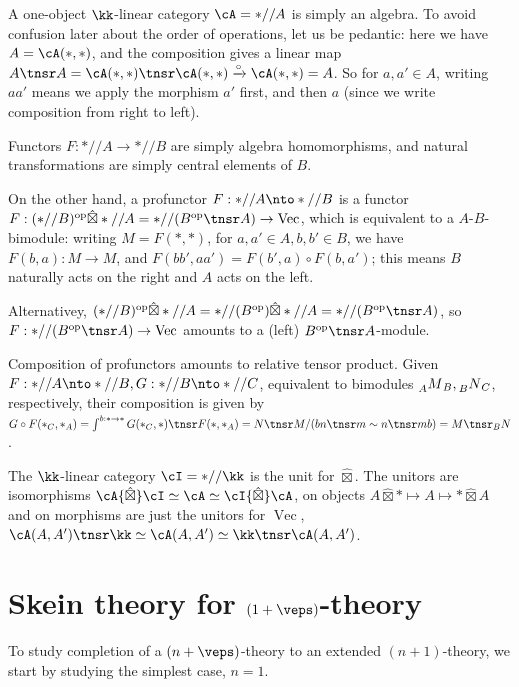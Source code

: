 \documentclass[12pt]{article}
\newcommand{\op}{{\text{op}}}
\newcommand{\hatbox}{{\hat{\boxtimes}}}
\DeclareMathOperator{\Vect}{Vec}
\begin{document}
\begin{example}
A one-object $\kk$-linear category $\cA = *//A$
is simply an algebra.
To avoid confusion later about the order of operations,
let us be pedantic: here we have $A = \cA(*,*)$,
and the composition gives a linear map
$A \tnsr A = \cA(*,*) \tnsr \cA(*,*) \xrightarrow{\circ} \cA(*,*) = A$.
So for $a,a'\in A$,
writing $aa'$ means we apply the morphism $a'$ first,
and then $a$
(since we write composition from right to left).

Functors $F: *//A \to *//B$ are simply algebra homomorphisms,
and natural transformations are simply central elements of $B$.

On the other hand, a profunctor $F: *//A \nto *//B$
is a functor
$F: (*//B)^\op \hatbox *//A = *//(B^\op \tnsr A) \to \Vect$,
which is equivalent to a $A$-$B$-bimodule:
writing $M = F(*,*)$,
for $a,a' \in A, b,b' \in B$,
we have $F(b,a): M \to M$,
and $F(bb',aa') = F(b',a) \circ F(b,a')$;
this means $B$ naturally acts on the right
and $A$ acts on the left.

Alternativey,
$(*//B)^\op \hatbox *//A = *//(B^\op) \hatbox *//A = *//(B^\op \tnsr A)$,
so $F: *//(B^\op \tnsr A) \to \Vect$
amounts to a (left) $B^\op \tnsr A$-module.


Composition of profunctors amounts to relative tensor product.
Given $F: *//A \nto *//B, G: *//B \nto *//C$,
equivalent to bimodules $\prescript{}{A}M_B,
\prescript{}{B}N_C$, respectively,
their composition is given by
$G \circ F(*_C,*_A) = \int^{b:* \to *} G(*_C,*) \tnsr F(*,*_A)
= N \tnsr M / (bn \tnsr m \sim n \tnsr mb)
= M \tnsr_B N$.

\end{example}


\begin{example}
The $\kk$-linear category $\cI = *//\kk$
is the unit for $\hatbox$.
The unitors are isomorphisms
$\cA \hatbox \cI \simeq \cA \simeq \cI \hatbox \cA$,
on objects
$A \hatbox * \mapsto A \mapsto * \hatbox A$
and on morphisms are just the unitors for $\Vect$,
$\cA(A,A') \tnsr \kk \simeq \cA(A,A') \simeq
\kk \tnsr \cA(A,A')$.
\end{example}


\section{Skein theory for $(1+\veps)$-theory}
\label{s:skeins}

To study completion of a $(n+\veps)$-theory
to an extended $(n+1)$-theory,
we start by studying the simplest case, $n = 1$.
\end{document}
